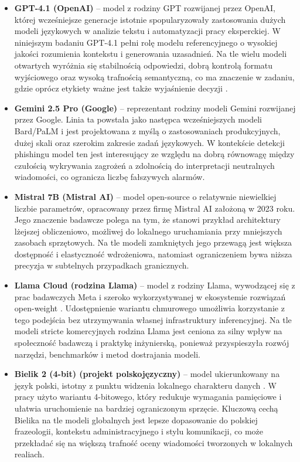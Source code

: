 \documentclass[12pt,a4paper,openany]{report}
\begin{document}
\begin{itemize}
    \item \textbf{GPT-4.1 (OpenAI)} -- model z rodziny GPT rozwijanej przez OpenAI, której wcześniejsze generacje istotnie spopularyzowały zastosowania dużych modeli językowych w analizie tekstu i automatyzacji pracy eksperckiej. W niniejszym badaniu GPT-4.1 pełni rolę modelu referencyjnego o wysokiej jakości rozumienia kontekstu i generowania uzasadnień. Na tle wielu modeli otwartych wyróżnia się stabilnością odpowiedzi, dobrą kontrolą formatu wyjściowego oraz wysoką trafnością semantyczną, co ma znaczenie w zadaniu, gdzie oprócz etykiety ważne jest także wyjaśnienie decyzji \cite{openai2024gpt4}.

    \item \textbf{Gemini 2.5 Pro (Google)} -- reprezentant rodziny modeli Gemini rozwijanej przez Google. Linia ta powstała jako następca wcześniejszych modeli Bard/PaLM i jest projektowana z myślą o zastosowaniach produkcyjnych, dużej skali oraz szerokim zakresie zadań językowych. W kontekście detekcji phishingu model ten jest interesujący ze względu na dobrą równowagę między czułością wykrywania zagrożeń a zdolnością do interpretacji neutralnych wiadomości, co ogranicza liczbę fałszywych alarmów.

    \item \textbf{Mistral 7B (Mistral AI)} -- model open-source o relatywnie niewielkiej liczbie parametrów, opracowany przez firmę Mistral AI założoną w 2023 roku. Jego znaczenie badawcze polega na tym, że stanowi przykład architektury lżejszej obliczeniowo, możliwej do lokalnego uruchamiania przy mniejszych zasobach sprzętowych. Na tle modeli zamkniętych jego przewagą jest większa dostępność i elastyczność wdrożeniowa, natomiast ograniczeniem bywa niższa precyzja w subtelnych przypadkach granicznych.

    \item \textbf{Llama Cloud (rodzina Llama)} -- model z rodziny Llama, wywodzącej się z prac badawczych Meta i szeroko wykorzystywanej w ekosystemie rozwiązań open-weight \cite{touvron2023llama}. Udostępnienie wariantu chmurowego umożliwia korzystanie z tego podejścia bez utrzymywania własnej infrastruktury inferencyjnej. Na tle modeli stricte komercyjnych rodzina Llama jest ceniona za silny wpływ na społeczność badawczą i praktykę inżynierską, ponieważ przyspieszyła rozwój narzędzi, benchmarków i metod dostrajania modeli.

    \item \textbf{Bielik 2 (4-bit) (projekt polskojęzyczny)} -- model ukierunkowany na język polski, istotny z punktu widzenia lokalnego charakteru danych \cite{bielik2024,piotrowski2024evaluating}. W pracy użyto wariantu 4-bitowego, który redukuje wymagania pamięciowe i ułatwia uruchomienie na bardziej ograniczonym sprzęcie. Kluczową cechą Bielika na tle modeli globalnych jest lepsze dopasowanie do polskiej frazeologii, kontekstu administracyjnego i stylu komunikacji, co może przekładać się na większą trafność oceny wiadomości tworzonych w lokalnych realiach.
\end{itemize}
\end{document}
